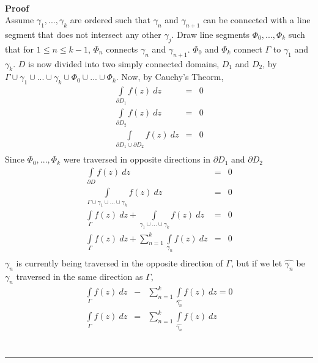 \documentclass{article}%
\newenvironment{proof}[1][]{\textbf{Proof #1} \\ }{\\ \rule{0.5em}{0.5em}  \\}
\begin{document}
\begin{enumerate}
\begin{enumerate}[label=\alph*)]
\begin{eqnarray*}
        \end{eqnarray*}
        \begin{proof}
            Assume $\gamma_1, ..., \gamma_k$ are ordered such that $\gamma_n$ and $\gamma_{n+1}$ can be connected with a line segment that does not
            intersect any other $\gamma_j$. Draw line segments $\Phi_0, ..., \Phi_k$ such that for $1\leq n\leq k-1$, $\Phi_n$ connects $\gamma_n$ and
            $\gamma_{n+1}$. $\Phi_0$ and $\Phi_k$ connect $\Gamma$ to $\gamma_1$ and $\gamma_k$. $D$ is now divided into two simply connected domains,
             $D_1$ and $D_2$, by $\Gamma \cup \gamma_1 \cup ... \cup \gamma_k \cup \Phi_0 \cup ... \cup \Phi_k$. Now, by Cauchy's Theorm, 
            \begin{eqnarray*}
                \int\limits_{\partial D_1}f(z)~dz &=& 0 \\
                \int\limits_{\partial D_2}f(z)~dz &=& 0 \\
                \int\limits_{\partial D_1 \cup \partial D_2}{f(z)~dz} &=& 0 \\
            \end{eqnarray*}
            Since $\Phi_0, ..., \Phi_k$ were traversed in opposite directions in $\partial D_1$ and $\partial D_2$
            \begin{eqnarray*}
                \int\limits_{\partial D}{f(z)~dz} &=& 0 \\
                \int\limits_{\Gamma\cup\gamma_1 \cup ... \cup \gamma_k}{f(z)~dz} &=& 0 \\
                \int\limits_{\Gamma}{f(z)~dz} + \int\limits_{\gamma_1 \cup ... \cup \gamma_k}{f(z)~dz} &=& 0 \\
                \int\limits_{\Gamma}{f(z)~dz} + \sum\limits_{n=1}^k{\int\limits_{\gamma_n}{f(z)~dz}} &=& 0 \\ 
            \end{eqnarray*}
            $\gamma_n$ is currently being traversed in the opposite direction of $\Gamma$, but if we let $\hat{\gamma_n}$ be $\gamma_n$ traversed in the
            same direction as $\Gamma$,
            \begin{eqnarray*}
                \int\limits_{\Gamma}{f(z)~dz} &-& \sum\limits_{n=1}^k{\int\limits_{\hat{\gamma_n}}{f(z)~dz}} = 0 \\
                \int\limits_{\Gamma}{f(z)~dz} &=& \sum\limits_{n=1}^k{\int\limits_{\hat{\gamma_n}}{f(z)~dz}} \\
            \end{eqnarray*}
        \end{proof}

\end{enumerate}
\end{enumerate}
\end{document}
